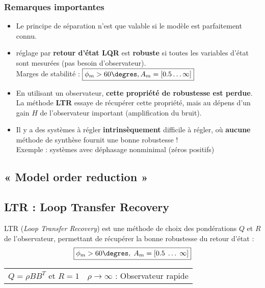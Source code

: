\documentclass[document.tex]{subfiles}
\begin{document}
\subsubsection{Remarques importantes}

\begin{itemize}
\item Le principe de séparation n'est que valable si le modèle est parfaitement connu.
\item  réglage par \textbf{retour d'état LQR} est \textbf{robuste} si toutes les variables d'état sont mesurées (pas besoin d'observateur).\\
Marges de stabilité : $\boxed{\phi_m > 60 \degres, A_m = [0.5 \ldots  \infty]}$
\item En utilisant un observateur, \textbf{cette propriété de robustesse est perdue}. La méthode \textbf{LTR} essaye de récupérer cette propriété, mais au dépens d'un gain $H$ de l'observateur important (amplification du bruit).
\item  Il y a des systèmes à régler \textbf{intrinsèquement} difficile à régler, où \textbf{aucune} méthode de synthèse fournit une bonne robustesse !\\
Exemple : systèmes avec déphasage nonminimal (zéros positifs)
\end{itemize}

\subsection{« Model order reduction »}


\subsection{LTR : Loop Transfer Recovery}


LTR (\textit{Loop Transfer Recovery}) est une méthode de choix des pondérations $Q$ et $R$ de l'observateur, permettant de récupérer la bonne robustesse du retour d'état :
$$ \boxed{\phi_m > 60 \degres,\; A_m = [0.5 \; \ldots \; \infty]} $$

\begin{center}
\begin{tabular}{l l}
$Q = \rho B B^T$ et $R=1$ & $\rho \longrightarrow \infty$ : Observateur rapide
\end{tabular}
\end{center}
\end{document}

